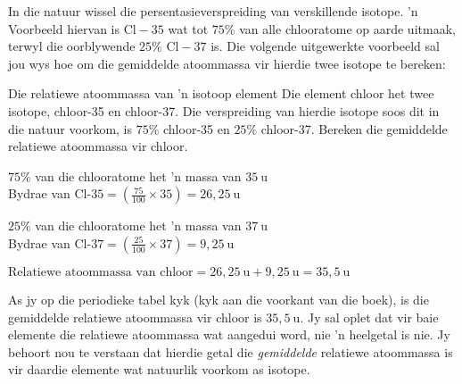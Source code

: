 In die natuur wissel die persentasieverspreiding van verskillende isotope.  'n Voorbeeld hiervan is $\text{Cl}-35$ wat tot $75\%$ van alle chlooratome op aarde uitmaak, terwyl die oorblywende $25\%$ $\text{Cl}-37$ is. Die volgende uitgewerkte voorbeeld sal jou wys
hoe om die gemiddelde atoommassa vir hierdie twee isotope te bereken: \par  
\begin{wex}{Die relatiewe atoommassa van 'n isotoop element}{
Die element chloor het twee isotope, chloor-35 en chloor-37. Die verspreiding van hierdie isotope soos dit in die natuur voorkom, is $75\%$ chloor-35 en $25\%$ chloor-37. Bereken die gemiddelde relatiewe atoommassa vir chloor.
}
{
$75\%$ van die chlooratome het 'n massa van $35~\text{u}$ \\
Bydrae van $\text{Cl-}35 = (\frac{75}{100} \times 35) = 26,25~\text{u}$

$25\%$ van die chlooratome het 'n massa van $37~\text{u}$ \\ 
Bydrae van $\text{Cl-}37 = (\frac{25}{100} \times 37) = 9,25~\text{u}$


$\text{Relatiewe atoommassa van chloor} = 26,25~\text{u} + 9,25~\text{u} = 35,5~\text{u}$ \\
}
\end{wex}
As jy op die periodieke tabel kyk (kyk aan die voorkant van die boek), is die gemiddelde relatiewe atoommassa vir chloor is $35,5~\text{u}$. Jy sal oplet dat vir baie elemente die relatiewe atoommassa wat aangedui word, nie 'n heelgetal is nie. Jy behoort nou te verstaan ​dat hierdie getal die \textsl{gemiddelde} relatiewe atoommassa is vir daardie elemente wat natuurlik voorkom as isotope.\par




